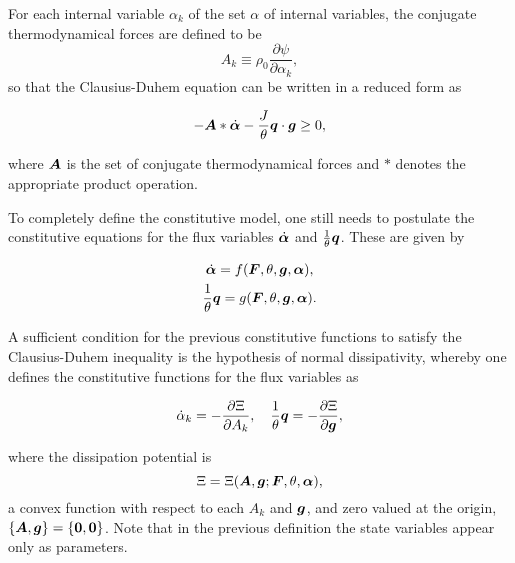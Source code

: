 For each internal variable $\alpha_k$ of the set $\alpha$ of internal variables, the conjugate thermodynamical forces are defined to be
\begin{equation}
    A_k\equiv \rho_0 \frac{\partial \psi}{\partial \alpha_k},
\end{equation}
so that the Clausius-Duhem equation can be written in a reduced form as
\begin{highlight}
    \begin{equation}
        -\bm A*\dot{\bm{\alpha}} - \frac{J}{\theta}\bm{q}\cdot \bm{g}\geq 0,
    \end{equation}
\end{highlight}
where $\bm{A}$ is the set of conjugate thermodynamical forces and \(*\) denotes the appropriate product operation.

To completely define the constitutive model, one still needs to postulate the constitutive equations for the flux variables $\dot{\bm{\alpha}}$ and $\frac{1}{\theta}\bm{q}$.
These are given by
\begin{highlight}[innertopmargin=-5pt]
            \begin{gather}     \dot{\bm{\alpha}} = f(\bm{F}, \theta, \bm{g}, \bm{\alpha}),\\      \frac{1}{\theta}\bm{q} = g(\bm{F}, \theta, \bm{g}, \bm{\alpha}).
            \end{gather}
\end{highlight}

A sufficient condition for the previous constitutive functions to satisfy the Clausius-Duhem inequality is the hypothesis of normal dissipativity, whereby one defines the constitutive functions for the flux variables as
\begin{highlight}
    \begin{equation}
        \dot \alpha_k = -\frac{\partial \Xi}{\partial A_k},\quad \frac{1}{\theta}\bm{q} = -\frac{\partial \Xi}{\partial \bm{g}},
    \end{equation}
\end{highlight}
where the dissipation potential is
\begin{equation}
    \Xi= \Xi(\bm{A}, \bm{g}; \bm{F}, \theta, \bm{\alpha}),
\end{equation}
a convex function with respect to each $A_k$ and $\bm{g}$, and zero valued at the origin, $\{\bm{A},\bm{g}\}=\{\bm{0},\bm{0}\}$.
Note that in the previous definition the state variables appear only as parameters.

\newpage\null\thispagestyle{blank}\newpage
